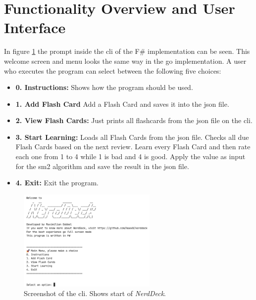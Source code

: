     \section{Functionality Overview and User Interface}
    In figure \ref{fig:screenshotcli} the prompt inside the \ac{cli} of the F\# implementation can be seen. This welcome screen and menu looks the same way in the go implementation. A user who executes the program can select between the following five choices:        
    \begin{itemize}
        \item \textbf{0. Instructions:} Shows how the program should be used.
        \item \textbf{1. Add Flash Card} Add a Flash Card and saves it into the \ac{json} file.
        \item \textbf{2. View Flash Cards:} Just prints all flashcards from the \ac{json} file on the \ac{cli}.
        \item \textbf{3. Start Learning:} Loads all Flash Cards from the \ac{json} file. Checks all due Flash Cards based on the next review. Learn every Flash Card and then rate each one from 1 to 4 while 1 is bad and 4 is good. Apply the value as input for the \ac{sm2} algorithm and save the result in the \ac{json} file.
        \item \textbf{4. Exit:} Exit the program.
    \end{itemize}

    \begin{figure}
        \centering
        \includegraphics[width=0.6\textwidth]{ScreenshotNerdDeck.png}
        \caption{Screenshot of the \ac{cli}. Shows start of \textit{NerdDeck}.}
        \label{fig:screenshotcli}
    \end{figure}


